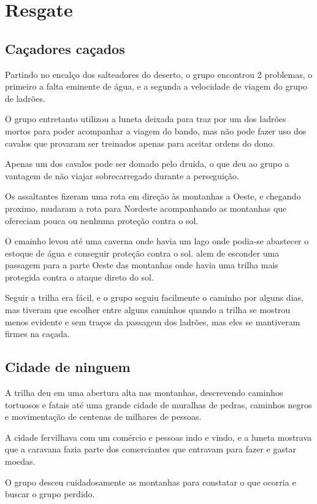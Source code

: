 \section{Resgate}

\subsection{Ca\c{c}adores ca\c{c}ados}
Partindo no encal\c{c}o dos salteadores do deserto, o grupo encontrou
2 problemas, o primeiro a falta eminente de \'agua, e a segunda a
velocidade de viagem do grupo de ladr\~oes.

O grupo entretanto utilizou a luneta deixada para traz por um dos
ladr\~oes mortos para poder acompanhar a viagem do bando,
mas n\~ao pode fazer uso dos cavalos que provaram ser
treinados apenas para aceitar ordens do dono.

Apenas um dos cavalos pode ser domado pelo druida, o que deu ao grupo
a vantagem de n\~ao viajar sobrecarregado durante a persegui\c{c}\~ao.

Os assaltantes fizeram uma rota em dire\c{c}\~ao \`as montanhas
a Oeste, e chegando proximo, mudaram a rota para Nordeste
acompanhando as montanhas que ofereciam pouca ou nenhuma prote\c{c}\~ao
contra o sol.

O cmainho levou at\'e uma caverna onde havia um lago onde podia-se
abastecer o estoque de \'agua e conseguir prote\c{c}\~ao contra o sol.
alem de esconder uma passagem para a parte Oeste das montanhas onde
havia uma trilha mais protegida contra o ataque direto do sol.

Seguir a trilha era f\'acil, e o grupo seguiu facilmente o caminho
por alguns dias, mas tiveram que escolher entre alguns caminhos quando
a trilha se mostrou menos evidente e sem tra\c{c}os da passagem
dos ladr\~oes, mas eles se mantiveram firmes na ca\c{c}ada.


\subsection{Cidade de ninguem}
A trilha deu em uma abertura alta nas montanhas, descrevendo caminhos
tortuosos e fatais at\'e uma grande cidade de muralhas de pedras,
caminhos negros e movimenta\c{c}\~ao de centenas de milhares de pessoas.

A cidade fervilhava com um com\'ercio e pessoas indo e vindo, e a
luneta mostrava que a caravana fazia parte dos comerciantes que entravam
para fazer e gastar moedas.

O grupo desceu cuidadosamente as montanhas para constatar o que ocorria
e buscar o grupo perdido.

